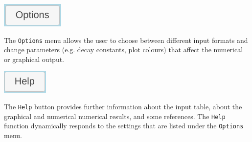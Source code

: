 \begin{refsection}
\noindent\begin{minipage}[t]{.15\textwidth}
\strut\vspace*{-\baselineskip}\newline
\includegraphics[width=.7\textwidth]{../figures/Options.png}
\end{minipage}
\begin{minipage}[t]{.85\textwidth}
The \texttt{Options} menu allows the user to choose between different
input formats and change parameters (e.g. decay constants, plot
colours) that affect the numerical or graphical output.\\
\end{minipage}

\noindent\begin{minipage}[t]{.15\textwidth}
\strut\vspace*{-\baselineskip}\newline
\includegraphics[width=.55\textwidth]{../figures/Help.png}
\end{minipage}
\begin{minipage}[t]{.85\textwidth}
The \texttt{Help} button provides further information about the input
table, about the graphical and numerical numerical results, and some
references. The \texttt{Help} function dynamically responds to the
settings that are listed under the \texttt{Options} menu.\\
\end{minipage}


\end{refsection}
